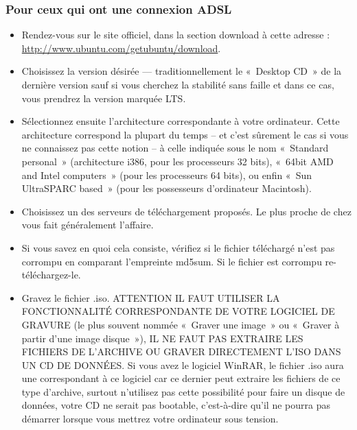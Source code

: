\subsubsection{Pour ceux qui ont une connexion ADSL}
\begin{itemize}
\item Rendez-vous sur le site officiel, dans la section download à cette adresse : \url{http://www.ubuntu.com/getubuntu/download}.
\item Choisissez la version désirée --- traditionnellement le «~Desktop CD~» de la dernière version sauf si vous cherchez la stabilité sans faille et dans ce cas, vous prendrez la version marquée LTS.
\item Sélectionnez ensuite l'architecture correspondante à votre ordinateur. Cette architecture correspond la plupart du temps -- et c'est sûrement le cas si vous ne connaissez pas cette notion -- à celle indiquée sous le nom «~Standard personal~» (architecture i386, pour les processeurs 32 bits), «~64bit AMD and Intel computers~» (pour les processeurs 64 bits), ou enfin «~Sun UltraSPARC based~» (pour les possesseurs d'ordinateur Macintosh).
\item Choisissez un des serveurs de téléchargement proposés. Le plus proche de chez vous fait généralement l'affaire.
\item Si vous savez en quoi cela consiste, vérifiez si le fichier téléchargé n'est pas corrompu en comparant l'empreinte md5sum. Si le fichier est corrompu re-téléchargez-le.
\item Gravez le fichier .iso. ATTENTION IL FAUT UTILISER LA FONCTIONNALITÉ CORRESPONDANTE DE VOTRE LOGICIEL DE GRAVURE (le plus souvent nommée «~Graver une image~» ou «~Graver à partir d'une image disque~»), IL NE FAUT PAS EXTRAIRE LES FICHIERS DE L'ARCHIVE OU GRAVER DIRECTEMENT L'ISO DANS UN CD DE DONNÉES. Si vous avez le logiciel WinRAR, le fichier .iso aura une  correspondant à ce logiciel car ce dernier peut extraire les fichiers de ce type d'archive, surtout n'utilisez pas cette possibilité pour faire un disque de données, votre CD ne serait pas bootable, c'est-à-dire qu'il ne pourra pas démarrer lorsque vous mettrez votre ordinateur sous tension.
\end{itemize}
